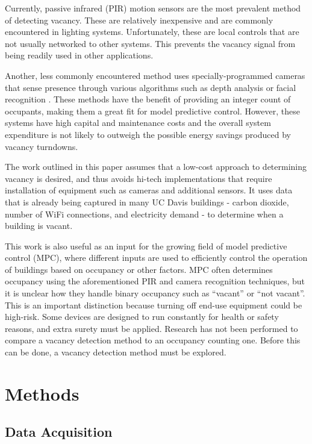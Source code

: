 \documentclass[letterpaper, 12 pt, conference]{ieeeconf}  %
\begin{document}
Currently, passive infrared (PIR) motion sensors are the most prevalent method of detecting vacancy. These are relatively inexpensive and are commonly encountered in lighting systems. Unfortunately, these are local controls that are not usually networked to other systems. This prevents the vacancy signal from being readily used in other applications.

Another, less commonly encountered method uses specially-programmed cameras that sense presence through various algorithms such as depth analysis \cite{Petersen} or facial recognition \cite{Viola}. These methods have the benefit of providing an integer count of occupants, making them a great fit for model predictive control. However, these systems have high capital and maintenance costs and the overall system expenditure is not likely to outweigh the possible energy savings produced by vacancy turndowns.

The work outlined in this paper assumes that a low-cost approach to determining vacancy is desired, and thus avoids hi-tech implementations that require installation of equipment such as cameras and additional sensors. It uses data that is already being captured in many UC Davis buildings - carbon dioxide, number of WiFi connections, and electricity demand - to determine when a building is vacant.

This work is also useful as an input for the growing field of model predictive control (MPC), where different inputs are used to efficiently control the operation of buildings based on occupancy or other factors. MPC often determines occupancy using the aforementioned PIR and camera recognition techniques, but it is unclear how they handle binary occupancy such as “vacant” or “not vacant”. This is an important distinction because turning off end-use equipment could be high-risk. Some devices are designed to run constantly for health or safety reasons, and extra surety must be applied. Research has not been performed to compare a vacancy detection method to an occupancy counting one. Before this can be done, a vacancy detection method must be explored.


\section{Methods}

\subsection{Data Acquisition}
\end{document}
